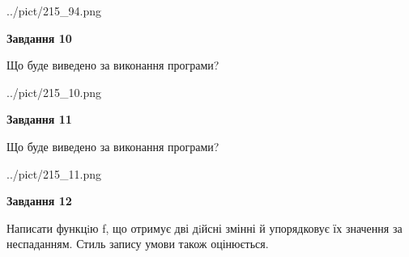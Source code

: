 \documentclass[12pt, ukrainian]{article}
\begin{document}
{\begin {large}
\begin{center}
	{../pict/215_94.png}
\end{center}
\newpage

{\begin {center}\textbf{Завдання 10}\end {center}}

Що буде виведено за виконання програми?\par
\begin{center}
	{../pict/215_10.png}
\end{center}
\newpage

{\begin {center}\textbf{Завдання 11}\end {center}}

Що буде виведено за виконання програми?\par
\begin{center}
	{../pict/215_11.png}
\end{center}
\newpage

{\begin {center}\textbf{Завдання 12}\end {center}}


Написати функцiю f, що отримує дві дiйсні змінні й упорядковує їх значення за неспаданням. Стиль запису умови також оцінюється.\par
\newpage

\end {large}}
\end{document}
